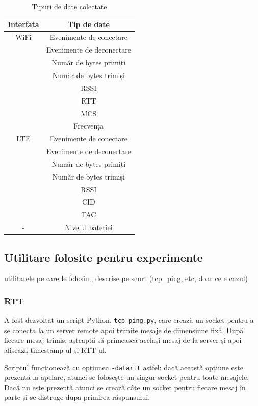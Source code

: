 \begin{table}[h!]
\centering
\caption{Tipuri de date colectate}
\label{tab:date}
\begin{tabular}{c | c}
\hline
Interfata & Tip de date  \\
\hline
WiFi & Evenimente de conectare \\
 & Evenimente de deconectare \\
 & Număr de bytes primiți \\
 & Număr de bytes trimiși \\
 & RSSI \\
 & RTT \\
 & MCS \\
 & Frecvența \\
\hline
LTE & Evenimente de conectare \\
 & Evenimente de deconectare \\
 & Număr de bytes primiți \\
 & Număr de bytes trimiși \\
 & RSSI \\
 & CID \\
 & TAC \\
\hline
- & Nivelul bateriei \\
\hline
\end{tabular}
\end{table}

\subsection{Utilitare folosite pentru experimente}

utilitarele pe care le folosim, descrise pe scurt (tcp\_ping, etc, doar ce e cazul)

\subsubsection{RTT}

A fost dezvoltat un script Python, \texttt{tcp\_ping.py}, care crează un socket pentru a se conecta la un server remote apoi trimite mesaje de dimensiune fixă. După fiecare mesaj trimis, așteaptă să primească același mesaj de la server și apoi afișează timestamp-ul și RTT-ul. 

Scriptul funcționează cu opțiunea \texttt{-datartt} astfel: dacă această opțiune este prezentă la apelare, atunci se folosește un singur socket pentru toate mesajele. Dacă nu este prezentă atunci se crează câte un socket pentru fiecare mesaj în parte și se distruge dupa primirea răspunsului.

